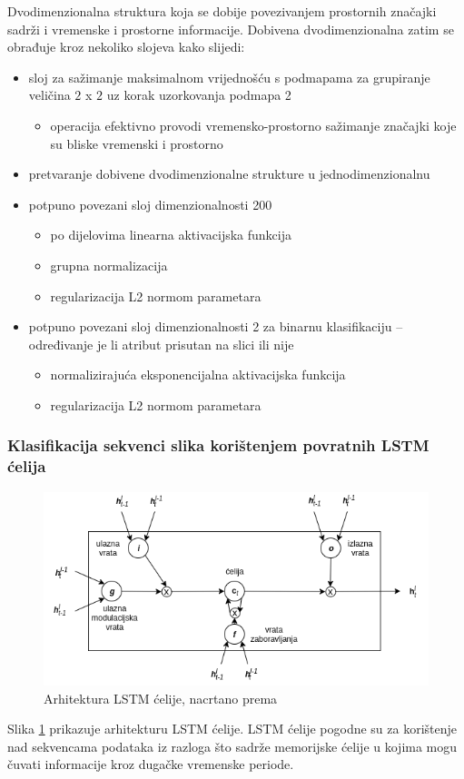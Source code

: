 \documentclass[times, utf8, diplomski, numeric]{fer}
\begin{document}
Dvodimenzionalna struktura koja se dobije povezivanjem prostornih značajki sadrži i vremenske i prostorne informacije. 
Dobivena dvodimenzionalna zatim se obrađuje kroz nekoliko slojeva kako slijedi:
\begin{itemize}
 \item sloj za sažimanje maksimalnom vrijednošću s podmapama za grupiranje veličina $2$ x $2$ uz korak uzorkovanja podmapa 2
 \begin{itemize}
  \item operacija efektivno provodi vremensko-prostorno sažimanje značajki koje su bliske vremenski i prostorno
 \end{itemize}
 \item pretvaranje dobivene dvodimenzionalne strukture u jednodimenzionalnu
 \item potpuno povezani sloj dimenzionalnosti 200
 \begin{itemize}
  \item po dijelovima linearna  aktivacijska funkcija
  \item grupna normalizacija 
  \item regularizacija L2 normom parametara
 \end{itemize}
 \item potpuno povezani sloj dimenzionalnosti 2 za binarnu klasifikaciju -- određivanje je li atribut prisutan na slici ili nije
 \begin{itemize}
  \item normalizirajuća eksponencijalna  aktivacijska funkcija
  \item regularizacija L2 normom parametara
 \end{itemize}
\end{itemize}

\subsubsection{Klasifikacija sekvenci slika korištenjem povratnih LSTM ćelija }
\begin{figure}[H]
\centering
\includegraphics[scale=0.6]{images/lstm.png}
\caption{Arhitektura LSTM ćelije, nacrtano prema \citep{article:lstm}}
\label{img:lstm}
\end{figure}
Slika \ref{img:lstm} prikazuje arhitekturu LSTM ćelije. 
LSTM ćelije pogodne su za korištenje nad sekvencama podataka iz razloga što sadrže memorijske ćelije u kojima mogu čuvati informacije kroz dugačke vremenske periode.
\end{document}
